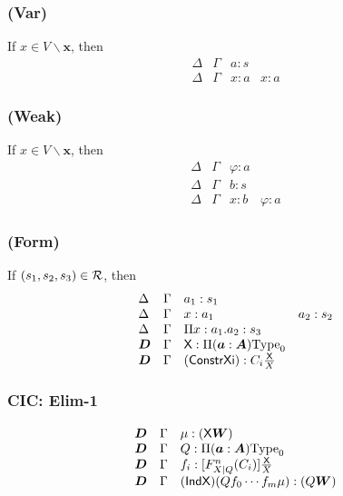 \subsubsection*{(Var)}
If $x \in V \smallsetminus \bm x$, then
\[
  \begin{array}{llll}
    \Delta & \Gamma & a : s & 
    \\
    \Delta & \Gamma & x : a & x : a
  \end{array}
\]


\subsubsection*{(Weak)}
If $x \in V \smallsetminus \bm x$, then
\[
  \begin{array}{llll}
    \Delta & \Gamma & \varphi : a & 
    \\ 
    \Delta & \Gamma & b : s  &
    \\
    \Delta & \Gamma & x : b & \varphi : a
  \end{array}
\]

\subsubsection*{(Form)}
If $(s_1, s_2, s_3) \in \mathcal{R}$, then 
\[
  \begin{array}{llll}
    \Delta & \Gamma & a_1 : s_1 & 
    \\ 
    \Delta & \Gamma & x : a_1   &  a_2 : s_2
    \\
    \Delta & \Gamma & \Pi x : a_1. a_2 : s_3 
    \\
    \boldsymbol{D} & \Gamma & \text{{\sffamily X}} : \Pi(\boldsymbol{a} : \boldsymbol{A}) \mathrm{Type}_0 
    \\
    \boldsymbol{D} & \Gamma & (\text{{\sffamily ConstrXi}}) : C_i \tfrac{\text{{\sffamily X}}}{X} 
  \end{array}
\]



\subsubsection*{CIC: Elim-1}

\[
  \begin{array}{lll}
    \boldsymbol{D} & \Gamma & \mu : (\text{{\sffamily X}} \boldsymbol{W}) \\
    \boldsymbol{D} & \Gamma & Q : \Pi(\boldsymbol{a} : \boldsymbol{A})\mathrm{Type}_0 \\
    \boldsymbol{D} & \Gamma & f_i : [F^n_{X| Q}(C_i)]\tfrac{\text{{\sffamily X}}}{X}\\
    \boldsymbol{D} & \Gamma & (\text{{\sffamily IndX}}) (Q f_0 \cdots f_m \mu) : (Q \boldsymbol{W})
  \end{array}
\]


